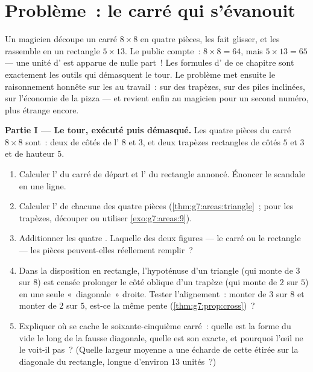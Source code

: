 \section{Problème~: le carré qui s'évanouit}

\begin{problem}[{Devoir maison --- une célèbre «~preuve~» que
$64 = 65$, démasquée par les aires et les pentes, avec pizzas et
anneaux pour le dessert}]
\label{pb:g7:areas:1}
Un magicien découpe un carré $8 \times 8$ en quatre pièces, les fait
glisser, et les rassemble en un rectangle $5 \times 13$. Le public
compte~: $8 \times 8 = 64$, mais $5 \times 13 = 65$ --- une unité
d' est apparue de nulle part~! Les formules d' de ce chapitre
sont exactement les outils qui démasquent le tour. Le problème met
ensuite le raisonnement honnête sur les  au travail~: sur des
trapèzes, sur des piles inclinées, sur l'économie de la pizza --- et
revient enfin au magicien pour un second numéro, plus étrange encore.

\medskip
\noindent\textbf{Partie I --- Le tour, exécuté puis démasqué.}
Les quatre pièces du carré $8 \times 8$ sont~: deux  de côtés de l' $8$ et $3$, et deux trapèzes
rectangles de côtés  $5$ et $3$ et de hauteur $5$.
\begin{enumerate}
  \item Calculer l' du carré de départ et l' du rectangle
        annoncé. Énoncer le scandale en une ligne.
  \item Calculer l' de chacune des quatre pièces
        (\cref{thm:g7:areas:triangle}~; pour les trapèzes, découper
        ou utiliser \cref{exo:g7:areas:9}).
  \item Additionner les quatre . Laquelle des deux figures ---
        le carré ou le rectangle --- les pièces peuvent-elles
        réellement remplir~?
  \item Dans la disposition en rectangle, l'hypoténuse d'un triangle
        (qui monte de $3$ sur $8$) est censée prolonger le côté
        oblique d'un trapèze (qui monte de $2$ sur $5$) en une seule
        «~diagonale~» droite. Tester l'alignement~: monter de $3$
        sur $8$ et monter de $2$ sur $5$, est-ce la même pente
        (\cref{thm:g7:prop:cross})~?
  \item Expliquer où se cache le soixante-cinquième carré~: quelle
        est la forme du vide le long de la fausse diagonale, quelle
        est son  exacte, et pourquoi l'œil ne le voit-il pas~?
        (Quelle largeur moyenne a une écharde de cette  étirée
        sur la diagonale du rectangle, longue d'environ $13$
        unités~?)
\end{enumerate}


\end{problem}
